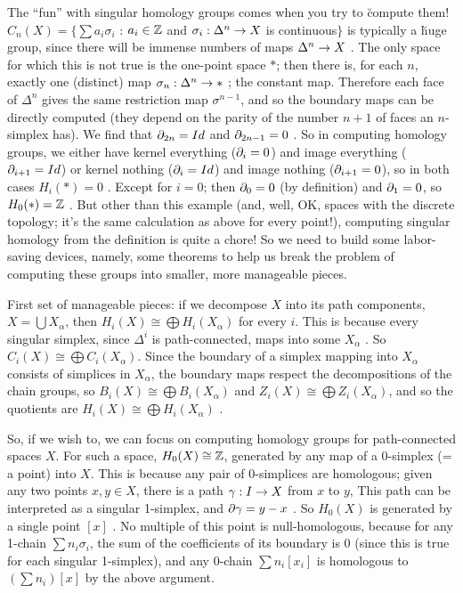 \vfill
\eject

The ``fun'' with singular homology groups comes when you try to \u{compute} them!
$C_n(X) = \{\sum a_i\sigma_i$ : $a_i\in {\Bbb Z}$ and $\sigma_i:\Delta^n\rightarrow X$ 
is continuous$\}$ is typically a \u{huge} group, since there will be immense
numbers of maps $\Delta^n\rightarrow X$ . The only space for which this is not true is
the one-point space $*$; then there is, for each $n$, exactly one (distinct)
map $\sigma_n :\Delta^n\rightarrow *$ ; the constant map. Therefore each face of $\Delta^n$
gives the same restriction map $\sigma^{n-1}$, and so the boundary maps can 
be directly computed (they depend on the parity of the number $n+1$ of faces 
an $n$-simplex has). We find that $\partial_{2n}=Id$ and $\partial_{2n-1}=0$ . So in 
computing homology groups, we either have kernel everything ($\partial_i=0$) and
image everything ($\partial_{i+1}=Id$) or kernel nothing ($\partial_i=Id$) and
image nothing ($\partial_{i+1}=0$), so in both cases $H_i(*)=0$ . Except for $i=0$;
then $\partial_0=0$ (by definition) and $\partial_1=0$, so $H_0(*)={\Bbb Z}$ .
But other than this example (and, well, OK, spaces with the discrete topology;
it's the same calculation as above for every point!), computing singular 
homology from the definition is quite a chore! So we need to build
some labor-saving devices, namely, some theorems to help us break the problem
of computing these groups into smaller, more manageable pieces.

\msk

First set of manageable pieces: if we decompose $X$ into its path components, $X=\bigcup X_\alpha$,
then $H_i(X) \cong \bigoplus H_i(X_\alpha)$ for every $i$. This is because every singular simplex,
since $\Delta^i$ is path-connected, maps into some $X_\alpha$ . So $C_i(X) \cong \bigoplus C_i(X_\alpha)$.
Since the boundary of a simplex mapping into $X_\alpha$ consists of simplices in $X_\alpha$, the 
boundary maps respect the decompositions of the chain groups, so 
$B_i(X) \cong \bigoplus B_i(X_\alpha)$ and $Z_i(X) \cong \bigoplus Z_i(X_\alpha)$, and so 
the quotients are $H_i(X) \cong \bigoplus H_i(X_\alpha)$ . 

\vfill
\eject

So, if we wish to, we can focus on computing homology groups for path-connected spaces $X$. For such a space, 
$H_0(X)\cong {\Bbb Z}$, generated by any map of a 0-simplex (= a point) into $X$. This is because any pair
of 0-simplices are homologous; given any two points $x,y\in X$, there is a path $\gamma: I\rightarrow X$ from $x$ to $y$,
This path can be interpreted as a singular 1-simplex, and $\partial\gamma = y-x$ . So $H_0(X)$ is generated
by a single point $[x]$ . No multiple of this point is null-homologous, because for any 1-chain $\sum n_i \sigma_i$,
the sum of the coefficients of its boundary is 0 (since this is true for each singular 1-simplex), and any 0-chain
$\sum n_i [x_i]$ is homologous to $(\sum n_i)[x]$ by the above argument.

